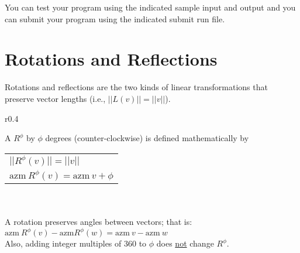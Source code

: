 \documentclass[12pt]{article}
\begin{document}
You can test your program using the indicated sample input and
output and you can submit your program using the indicated submit
run file.

\newpage

\section{Rotations and Reflections}
Rotations and reflections are the two kinds of linear transformations
that preserve vector lengths (i.e., $||L(v)||=||v||$).

\begin{minipage}{\textwidth}\raggedright
\begin{wrapfigure}[5]{r}{0.4\textwidth}
\end{wrapfigure}
A  $R^\phi$ by $\phi$ degrees (counter-\EOL clockwise)
is defined mathematically by
\hspace*{0.2in}\begin{tabular}[t]{l}
$||R^\phi(v)|| = ||v||$ \\
$\mathrm{azm}~R^\phi(v) = \mathrm{azm}~v + \phi$ \\
\end{tabular} \\
~\\
A rotation preserves angles between vectors; that is: \\
\hspace*{0.2in}$\mathrm{azm}~R^\phi(v)-\mathrm{azm}R^\phi(w)
               = \mathrm{azm}~v-\mathrm{azm}~w$ \\
Also, adding integer multiples of 360 to $\phi$
does \underline{not} change $R^\phi$.
\end{minipage}
\end{document}
